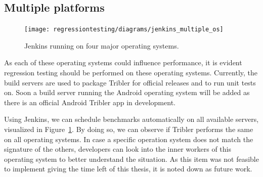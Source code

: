 \subsection{Multiple platforms}

\begin{figure}[!h]
	\centering
	\texttt{[image: regressiontesting/diagrams/jenkins\_multiple\_os]}
	\caption{Jenkins running on four major operating systems.}
	\label{fig:jenkins_multiple_os}
\end{figure} 

As each of these operating systems could influence performance, it is evident regression testing should be performed on these operating systems.
Currently, the build servers are used to package Tribler for official releases and to run unit tests on.
Soon a build server running the Android operating system will be added as there is an official Android Tribler app in development.

Using Jenkins, we can schedule benchmarks automatically on all available servers, visualized in Figure~\ref{fig:jenkins_multiple_os}.
By doing so, we can observe if Tribler performs the same on all operating systems.
In case a specific operation system does not match the signature of the others, developers can look into the inner workers of this operating system to better understand the situation.
As this item was not feasible to implement giving the time left of this thesis, it is noted down as future work.